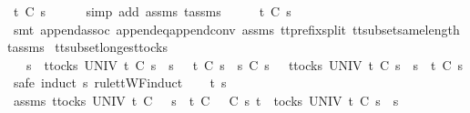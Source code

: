\ {\isachardoublequoteopen}t{\isacharprime}\ {\isasymle}\isactrlsub C\ s{}{\isachardoublequoteclose}\isanewline
\ \ \ \ \isamarkupfalse%
\ {\isacharparenleft}simp\ add{\isacharcolon}\ assms{\isacharparenleft}{}{\isacharparenright}\ t{\isacharprime}{\isacharunderscore}assms{\isacharparenright}\isanewline
\ \ \isamarkupfalse%
\ \isamarkupfalse%
\ {\isachardoublequoteopen}t\ {\isasymle}\isactrlsub C\ s{}{\isachardoublequoteclose}\isanewline
\ \ \ \ \isamarkupfalse%
\ {\isacharparenleft}smt\ append{\isacharunderscore}assoc\ append{\isacharunderscore}eq{\isacharunderscore}append{\isacharunderscore}conv\ assms{\isacharparenleft}{}{\isacharparenright}\ tt{\isacharunderscore}prefix{\isacharunderscore}split\ tt{\isacharunderscore}subset{\isacharunderscore}same{\isacharunderscore}length\ t{\isacharprime}{\isacharunderscore}assms{\isacharparenright}\isanewline
{}\isamarkupfalse%
%
\endisatagproof
{\isafoldproof}%
%
\isadelimproof
\isanewline
%
\endisadelimproof
\isanewline
{}\isamarkupfalse%
\ tt{\isacharunderscore}subset{\isacharunderscore}longest{\isacharunderscore}tocks{}{\isacharcolon}\isanewline
\ \ {\isachardoublequoteopen}{\isasymAnd}\ s{}{\isacharprime}{\isachardot}\ {\isasymforall}\ t{\isasymin}tocks\ UNIV{\isachardot}\ t\ {\isasymle}\isactrlsub C\ s{}\ {\isacharat}\ s{}\ \ {\isasymlongrightarrow}\ t\ {\isasymle}\isactrlsub C\ s{}\ {\isasymLongrightarrow}\ s{}\ {\isasymsubseteq}\isactrlsub C\ s{}{\isacharprime}\ {\isasymLongrightarrow}\ {\isasymforall}\ t{\isasymin}tocks\ UNIV{\isachardot}\ t\ {\isasymle}\isactrlsub C\ s{}{\isacharprime}\ {\isacharat}\ s{}\ {\isasymlongrightarrow}\ t\ {\isasymle}\isactrlsub C\ s{}{\isacharprime}{\isachardoublequoteclose}\isanewline
%
\isadelimproof
%
\endisadelimproof
%
\isatagproof
{}\isamarkupfalse%
\ {\isacharparenleft}safe{\isacharcomma}\ induct\ s{}\ rule{\isacharcolon}ttWF{\isachardot}induct{\isacharparenright}\isanewline
\ \ \isamarkupfalse%
\ t\ s{}{\isacharprime}\isanewline
\ \ \isamarkupfalse%
\ assms{\isacharcolon}\ {\isachardoublequoteopen}{\isasymforall}t{\isasymin}tocks\ UNIV{\isachardot}\ t\ {\isasymle}\isactrlsub C\ {\isacharbrackleft}{\isacharbrackright}\ {\isacharat}\ s{}\ {\isasymlongrightarrow}\ t\ {\isasymle}\isactrlsub C\ {\isacharbrackleft}{\isacharbrackright}{\isachardoublequoteclose}\ {\isachardoublequoteopen}{\isacharbrackleft}{\isacharbrackright}\ {\isasymsubseteq}\isactrlsub C\ s{}{\isacharprime}{\isachardoublequoteclose}\ {\isachardoublequoteopen}t\ {\isasymin}\ tocks\ UNIV{\isachardoublequoteclose}\ {\isachardoublequoteopen}t\ {\isasymle}\isactrlsub C\ s{}{\isacharprime}\ {\isacharat}\ s{}{\isachardoublequoteclose}\isanewline
